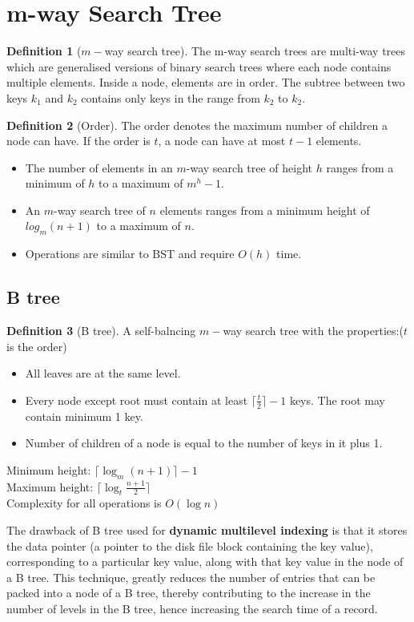 \documentclass[10pt, a4paper]{extarticle}
\theoremstyle{definition}
\newtheorem{defn}{Definition}
\begin{document}
\section{m-way Search Tree}
\begin{defn}[$m-$way search tree]
	The m-way search trees are multi-way trees which are generalised versions of binary search trees where each node contains multiple elements. Inside a node, elements are in order. The subtree between two keys $k_1$ and $k_2$ contains only keys in the range from $k_2$ to $k_2$.
\end{defn}
\begin{defn}[Order]
	The order denotes the maximum number of children a node can have. If the order is $t$, a node can have at most $t-1$ elements.
\end{defn}
\begin{itemize}
	\item The number of elements in an $m$-way search tree of height $h$ ranges from a minimum of $h$ to a maximum of $m^{h} -1$.

	\item An $m$-way search tree of $n$ elements ranges from a minimum height of $log_m(n+1)$ to a maximum of $n$.
	\item Operations are similar to BST and require $O(h)$ time.
\end{itemize}
\subsection{B tree}
\begin{defn}[B tree]
	A self-balncing $m-$way search tree with the properties:($t$ is the order)
	\begin{itemize}
		\item All leaves are at the same level.
		\item Every node except root must contain at least $\lceil\frac{t}{2}\rceil-1$ keys. The root may contain minimum 1 key.
		\item Number of children of a node is equal to the number of keys in it plus 1.
	\end{itemize}
	Minimum height: $\lceil\log_m(n+1)\rceil-1$\\
	Maximum height: $\lceil\log_t\frac{n+1}{2}\rceil$\\
	Complexity for all operations is $O(\log n)$
\end{defn}
The drawback of B tree used for \textbf{dynamic multilevel indexing} is that it stores the data pointer (a pointer to the disk file block containing the key value), corresponding to a particular key value, along with that key value in the node of a B tree. This technique, greatly reduces the number of entries that can be packed into a node of a B tree, thereby contributing to the increase in the number of levels in the B tree, hence increasing the search time of a record.
\end{document}
